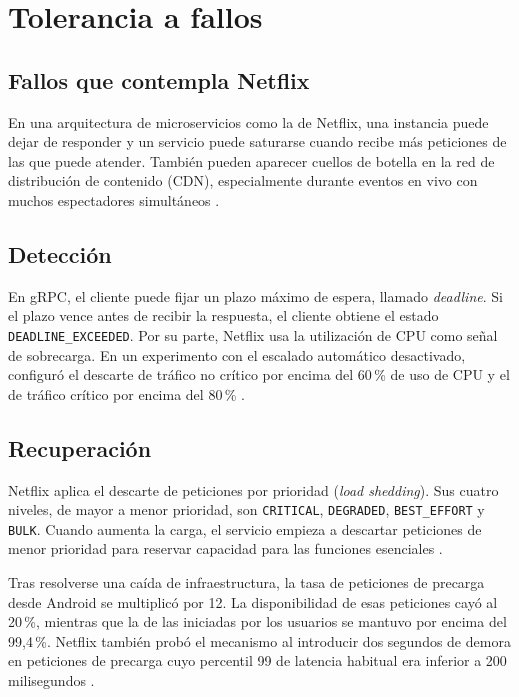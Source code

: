 \section{Tolerancia a fallos}

\subsection{Fallos que contempla Netflix}
En una arquitectura de microservicios como la de Netflix, una instancia puede dejar de responder y un servicio puede saturarse cuando recibe más peticiones de las que puede atender. También pueden aparecer cuellos de botella en la red de distribución de contenido (CDN), especialmente durante eventos en vivo con muchos espectadores simultáneos \cite{fallos-netflix,fallos-thousandeyes}.

\subsection{Detección}
En gRPC, el cliente puede fijar un plazo máximo de espera, llamado \emph{deadline}. Si el plazo vence antes de recibir la respuesta, el cliente obtiene el estado \texttt{DEADLINE\_EXCEEDED}. Por su parte, Netflix usa la utilización de CPU como señal de sobrecarga. En un experimento con el escalado automático desactivado, configuró el descarte de tráfico no crítico por encima del 60\,\% de uso de CPU y el de tráfico crítico por encima del 80\,\% \cite{fallos-grpc,fallos-netflix}.

\subsection{Recuperación}
Netflix aplica el descarte de peticiones por prioridad (\emph{load shedding}). Sus cuatro niveles, de mayor a menor prioridad, son \texttt{CRITICAL}, \texttt{DEGRADED}, \texttt{BEST\_EFFORT} y \texttt{BULK}. Cuando aumenta la carga, el servicio empieza a descartar peticiones de menor prioridad para reservar capacidad para las funciones esenciales \cite{fallos-netflix}.

Tras resolverse una caída de infraestructura, la tasa de peticiones de precarga desde Android se multiplicó por 12. La disponibilidad de esas peticiones cayó al 20\,\%, mientras que la de las iniciadas por los usuarios se mantuvo por encima del 99,4\,\%. Netflix también probó el mecanismo al introducir dos segundos de demora en peticiones de precarga cuyo percentil 99 de latencia habitual era inferior a 200 milisegundos \cite{fallos-netflix}.

